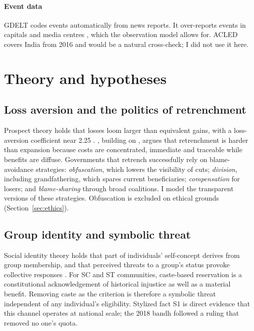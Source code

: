 \documentclass[11pt,a4paper]{article}
\begin{document}
\paragraph{Event data} GDELT \citep{leetaru2013} codes events automatically from news reports. It over-reports events in capitals and media centres \citep{hammond2014}, which the observation model allows for. ACLED \citep{raleigh2010} covers India from 2016 and would be a natural cross-check; I did not use it here.

\section{Theory and hypotheses}
\label{sec:theory}

\subsection{Loss aversion and the politics of retrenchment}
Prospect theory holds that losses loom larger than equivalent gains, with a loss-aversion coefficient near 2.25 \citep{kahneman1979,tversky1992}. \citet{pierson1994,pierson1996}, building on \citet{weaver1986}, argues that retrenchment is harder than expansion because costs are concentrated, immediate and traceable while benefits are diffuse. Governments that retrench successfully rely on blame-avoidance strategies: \emph{obfuscation}, which lowers the visibility of cuts; \emph{division}, including grandfathering, which spares current beneficiaries; \emph{compensation} for losers; and \emph{blame-sharing} through broad coalitions. I model the transparent versions of these strategies. Obfuscation is excluded on ethical grounds (Section~\ref{sec:ethics}).

\subsection{Group identity and symbolic threat}
Social identity theory holds that part of individuals' self-concept derives from group membership, and that perceived threats to a group's status provoke collective responses \citep{tajfel1979}. For SC and ST communities, caste-based reservation is a constitutional acknowledgement of historical injustice as well as a material benefit. Removing caste as the criterion is therefore a symbolic threat independent of any individual's eligibility. Stylized fact S1 is direct evidence that this channel operates at national scale; the 2018 bandh followed a ruling that removed no one's quota.
\end{document}
